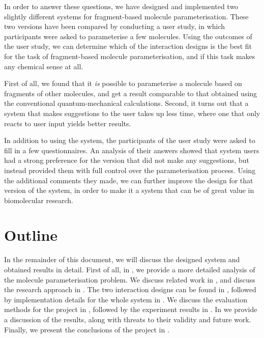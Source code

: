 In order to answer these questions, we have designed and implemented two slightly different systems for fragment-based molecule parameterisation. These two versions have been compared by conducting a user study, in which participants were asked to parameterise a few molecules. Using the outcomes of the user study, we can determine which of the interaction designs is the best fit for the task of fragment-based molecule parameterisation, and if this task makes any chemical sense at all.

First of all, we found that it \emph{is} possible to parameterise a molecule based on fragments of other molecules, and get a result comparable to that obtained using the conventional quantum-mechanical calculations. Second, it turns out that a system that makes suggestions to the user takes up less time, where one that only reacts to user input yields better results.

In addition to using the system, the participants of the user study were asked to fill in a few questionnaires. An analysis of their answers showed that system users had a strong preference for the version that did not make any suggestions, but instead provided them with full control over the parameterisation process. Using the additional comments they made, we can further improve the design for that version of the system, in order to make it a system that can be of great value in biomolecular research.



\section{Outline}
In the remainder of this document, we will discuss the designed system and obtained results in detail. First of all, in , we provide a more detailed analysis of the molecule parameterisation problem. We discuss related work in , and discuss the research approach in . The two interaction designs can be found in , followed by implementation details for the whole system in . We discuss the evaluation methods for the project in , followed by the experiment results in . In  we provide a discussion of the results, along with threats to their validity and future work. Finally, we present the conclusions of the project in .
